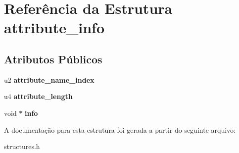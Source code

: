 \hypertarget{structattribute__info}{}\section{Referência da Estrutura attribute\+\_\+info}
\label{structattribute__info}
\subsection*{Atributos Públicos}
\begin{DoxyCompactItemize}
\item 
\mbox{\label{structattribute__info_a19df9d4b42eb55ca5dc1bed98df89378}} 
u2 {\bfseries attribute\+\_\+name\+\_\+index}
\item 
\mbox{\label{structattribute__info_a1ed8f679458c4bb0ed3315721588f50d}} 
u4 {\bfseries attribute\+\_\+length}
\item 
\mbox{\label{structattribute__info_a7f168925308e418b7b44c9f11fdf42ae}} 
void $\ast$ {\bfseries info}
\end{DoxyCompactItemize}


A documentação para esta estrutura foi gerada a partir do seguinte arquivo\+:\begin{DoxyCompactItemize}
\item 
structures.\+h\end{DoxyCompactItemize}

